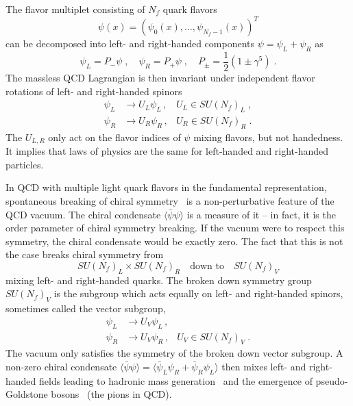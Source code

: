 The flavor multiplet consisting of $N_f$ quark flavors
\begin{equation}
\psi(x) = ( \psi_0(x), \ldots, \psi_{N_f-1}(x) )^{T}
\end{equation}
can be decomposed into left- and right-handed components $\psi = \psi_L + \psi_R$ as
\begin{equation}
\psi_L = P_{-} \psi \;,
\quad
\psi_R = P_{+} \psi \;,
\quad
P_{\pm} = \frac{1}{2} ( 1 \pm \gamma^{5}) \;.
\end{equation}
The massless QCD Lagrangian is then invariant under independent flavor rotations of left- and right-handed spinors
\begin{align}
\psi_L &\rightarrow U_L \psi_L \,, &U_L \in SU(N_f)_L \;, \\
\psi_R &\rightarrow U_R \psi_R \,, &U_R \in SU(N_f)_R \;.
\end{align}
The $U_{L,R}$ only act on the flavor indices of $\psi$ mixing flavors, but not handedness.
It implies that laws of physics are the same for left-handed and right-handed particles.

In QCD with multiple light quark flavors in the fundamental representation, spontaneous breaking of chiral symmetry~\cite{PhysRev.117.648} is a non-perturbative feature of the QCD vacuum.
The chiral condensate $\langle \bar{\psi} \psi \rangle$ is a measure of it -- in fact, it is the order parameter of chiral symmetry breaking.
If the vacuum were to respect this symmetry, the chiral condensate would be exactly zero.
The fact that this is not the case breaks chiral symmetry from
\begin{equation}
SU(N_f)_L \times SU(N_f)_R
\quad
\text{down to}
\quad
SU(N_f)_V
\end{equation}
mixing left- and right-handed quarks.
The broken down symmetry group $SU(N_f)_V$ is the subgroup which acts equally on left- and right-handed spinors, sometimes called the vector subgroup,
\begin{align}
\psi_L &\rightarrow U_V \psi_L \,, \\
\psi_R &\rightarrow U_V \psi_R \,, &U_V \in SU(N_f)_V \;.
\end{align}
The vacuum only satisfies the symmetry of the broken down vector subgroup.
A non-zero chiral condensate $\langle \bar{\psi} \psi \rangle = \langle \bar{\psi}_L \psi_R + \bar{\psi}_R \psi_L \rangle$ then mixes left- and right-handed fields leading to hadronic mass generation~\cite{PhysRev.122.345} and the emergence of pseudo-Goldstone bosons~\cite{Nambu:1960xd,Goldstone:1961eq,PhysRev.127.965} (the pions in QCD).

